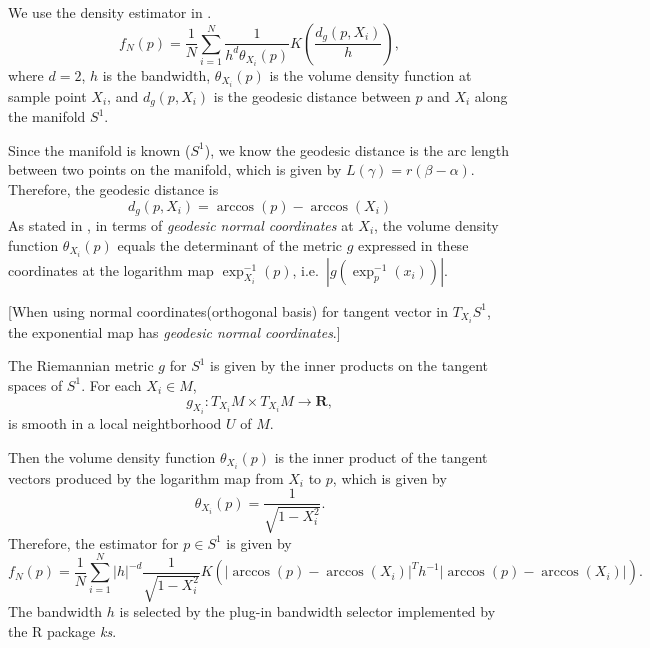 \documentclass[11pt,a4paper,]{article}
\begin{document}
We use the density estimator in \textcite{Pelletier2005-vu}.
\[
f_N(p) = \frac{1}{N} \sum_{i=1}^{N} \frac{1}{h^d \theta_{X_i}(p)} K(\frac{d_g(p, X_i)}{h}),
\]
where \(d=2\), \(h\) is the bandwidth, \(\theta_{X_i}(p)\) is the volume density function at sample point \(X_i\), and \(d_g(p, X_i)\) is the geodesic distance between \(p\) and \(X_i\) along the manifold \(S^1\).

Since the manifold is known (\(S^1\)), we know the geodesic distance is the arc length between two points on the manifold, which is given by \(L(\gamma) = r(\beta - \alpha)\). Therefore, the geodesic distance is
\[
d_g(p, X_i) = \arccos(p) - \arccos(X_i)
\]
As stated in \textcite{Pelletier2005-vu}, in terms of \emph{geodesic normal coordinates} at \(X_i\), the volume density function \(\theta_{X_i}(p)\) equals the determinant of the metric \(g\) expressed in these coordinates at the logarithm map \(\exp_{X_i}^{-1}(p)\), i.e.~\(|g(\exp_p^{-1}(x_i))|\).

{[}When using normal coordinates(orthogonal basis) for tangent vector in \(T_{X_i}S^1\), the exponential map has \emph{geodesic normal coordinates}.{]}

The Riemannian metric \(g\) for \(S^1\) is given by the inner products on the tangent spaces of \(S^1\). For each \(X_i \in M\),
\[
g_{X_i}: T_{X_i}M \times T_{X_i}M \rightarrow \pmb{R},
\]
is smooth in a local neightborhood \(U\) of \(M\).

Then the volume density function \(\theta_{X_i}(p)\) is the inner product of the tangent vectors produced by the logarithm map from \(X_i\) to \(p\), which is given by
\[
\theta_{X_i}(p) = \frac{1}{\sqrt{1 - X_i^2}}.
\]
Therefore, the estimator for \(p \in S^1\) is given by
\[
f_N(p) = \frac{1}{N} \sum_{i=1}^{N} |h|
^{-d} \frac{1}{\sqrt{1 - X_i^2}} K(|\arccos(p) - \arccos(X_i)|^{T}h^{-1}|\arccos(p) - \arccos(X_i)|).
\]
The bandwidth \(h\) is selected by the plug-in bandwidth selector implemented by the R package \emph{ks}.

\newpage

\printbibliography
\end{document}
